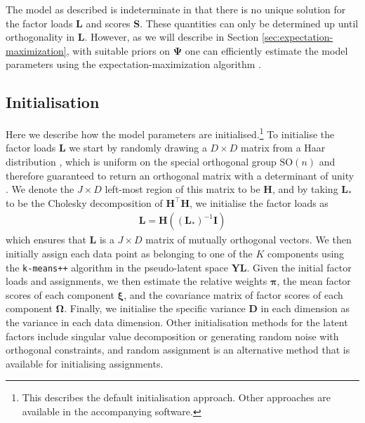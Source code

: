 \documentclass[twocolumn]{aastex62}
\newcommand{\vect}[1]{\boldsymbol{\mathbf{#1}}}
\renewcommand{\vec}[1]{\vect{#1}}
\newcommand{\data}{\textbf{Y}}
\newcommand{\vecdata}{\vec\data}
\newcommand{\transpose}{^\intercal}
\newcommand{\eye}{\textbf{I}}
\newcommand{\factorloads}{\textbf{L}}
\newcommand{\factorscores}{\textbf{S}}
\newcommand{\specificvariance}{\vec{D}}
\newcommand{\scoremeans}{\vec\xi}
\newcommand{\scorecovs}{\vec\Omega}
\newcommand{\NumDimensions}{D}
\newcommand{\NumLatentFactors}{J}
\newcommand{\NumComponents}{K}
\begin{document}
The model as described is indeterminate in that there is no unique 
solution for the factor loads $\factorloads$ and scores
$\factorscores$. These quantities can only be determined up until 
orthogonality in $\factorloads$. However, as we will describe in Section \ref{sec:expectation-maximization}, with suitable priors on $\vec\Psi$ 
one can efficiently estimate the model parameters using the expectation-maximization
algorithm \citep{Dempster:1977}. 


\subsection{Initialisation} \label{sec:initialisation}

Here we describe how the model parameters are initialised.\footnote{This describes the default initialisation approach. Other approaches are available in the accompanying software.}
To initialise the factor loads $\factorloads$ we start by randomly drawing a $\NumDimensions \times \NumDimensions$ matrix from a Haar distribution \citep{Haar:1933},
which is uniform on the special orthogonal group $\textrm{SO}(n)$ and therefore guaranteed to return an orthogonal
matrix with a determinant of unity \citep{Stewart:1980}.
We denote the $\NumLatentFactors \times \NumDimensions$ left-most region of this
matrix to be $\mathbf{H}$, and by taking $\factorloads_\ast$ to be the Cholesky decomposition of $\mathbf{H}\transpose \mathbf{H}$, we initialise the factor loads as
\begin{eqnarray}
 	\factorloads = \mathbf{H}\left(\left(\factorloads_\ast\right)^{-1}\eye\right)
\end{eqnarray}
\noindent{}which ensures that $\factorloads$ is a $\NumLatentFactors \times \NumDimensions$
matrix of mutually orthogonal vectors.
We then initially assign each data point as belonging to one of the
$\NumComponents$ components using the \texttt{k-means++} algorithm \citep{Arthur:2007}
in the pseudo-latent space $\vecdata\factorloads$. Given the initial
factor loads and assignments, we then estimate the relative weights
$\vec\pi$, the mean factor scores of each component $\scoremeans$, and
the covariance matrix of factor scores of each component $\scorecovs$.
Finally, we initialise the specific variance $\specificvariance$ in each
dimension as the variance in each data dimension. Other initialisation 
methods for the latent factors include singular value decomposition \citep{Golub:1970}
or generating random noise with orthogonal constraints, and random assignment
is an alternative method that is available for initialising assignments.
\end{document}
